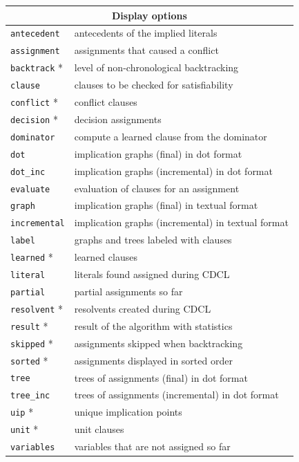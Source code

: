 \documentclass[11pt]{article}
\newcommand*{\p}[1]{\textup{\texttt{#1}}}
\begin{document}
\begin{center}
\begin{tabular}{|l|l|}
\hline
\multicolumn{2}{|c|}{\textbf{\large Display options}}\\
\hline
\p{antecedent}&  antecedents of the implied literals\\
\p{assignment}& assignments that caused a conflict         \\
\p{backtrack} *&  level of non-chronological backtracking    \\
\p{clause}   &  clauses to be checked for satisfiability   \\
\p{conflict} * &  conflict clauses                           \\
\p{decision} * &  decision assignments                       \\
\p{dominator} &  compute a learned clause from the dominator  \\
\p{dot}       &  implication graphs (final) in dot format           \\
\p{dot\_inc}  &  implication graphs (incremental) in dot format\\
\p{evaluate}  &  evaluation of clauses for an assignment    \\
\p{graph}     &  implication graphs (final) in textual format                \\
\p{incremental}& implication graphs (incremental) in textual format          \\
\p{label}     &  graphs and trees labeled with clauses\\
\p{learned} *  &  learned clauses                            \\
\p{literal}   &  literals found assigned during CDCL        \\
\p{partial}   &  partial assignments so far                  \\
\p{resolvent} * &  resolvents created during CDCL             \\
\p{result} *   &  result of the algorithm with statistics    \\
\p{skipped} *  &  assignments skipped when backtracking      \\
\p{sorted} *   & assignments displayed in sorted order\\
\p{tree}       & trees of assignments (final) in dot format\\
\p{tree\_inc}  & trees of assignments (incremental) in dot format\\
\p{uip} *       &  unique implication points                  \\
\p{unit} *     &  unit clauses                               \\
\p{variables} &  variables that are not assigned so far     \\
\hline
\end{tabular}
\end{center}
\end{document}
